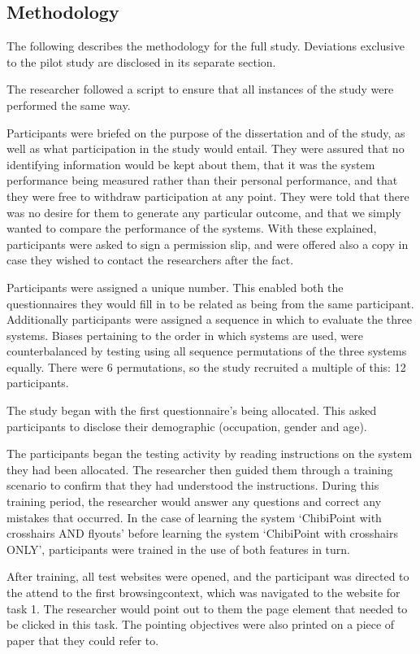 \documentclass[a4paper, 12pt]{report}
\begin{document}
\subsection{Methodology}
The following describes the methodology for the full study. Deviations exclusive to the pilot study are disclosed in its separate section.

The researcher followed a script to ensure that all instances of the study were performed the same way.

Participants were briefed on the purpose of the dissertation and of the study, as well as what participation in the study would entail. They were assured that no identifying information would be kept about them, that it was the system performance being measured rather than their personal performance, and that they were free to withdraw participation at any point. They were told that there was no desire for them to generate any particular outcome, and that we simply wanted to compare the performance of the systems. With these explained, participants were asked to sign a permission slip, and were offered also a copy in case they wished to contact the researchers after the fact.

Participants were assigned a unique number. This enabled both the questionnaires they would fill in to be related as being from the same participant. Additionally participants were assigned a sequence in which to evaluate the three systems. Biases pertaining to the order in which systems are used, were counterbalanced by testing using all sequence permutations of the three systems equally. There were 6 permutations, so the study recruited a multiple of this: 12 participants.

The study began with the first questionnaire's being allocated. This asked participants to disclose their demographic (occupation, gender and age).

The participants began the testing activity by reading instructions on the system they had been allocated. The researcher then guided them through a training scenario to confirm that they had understood the instructions. During this training period, the researcher would answer any questions and correct any mistakes that occurred. In the case of learning the system `ChibiPoint with crosshairs AND flyouts' before learning the system `ChibiPoint with crosshairs ONLY', participants were trained in the use of both features in turn.

After training, all test websites were opened, and the participant was directed to the attend to the first \gls{browsingcontext}, which was navigated to the website for task 1. The researcher would point out to them the page element that needed to be clicked in this task. The pointing objectives were also printed on a piece of paper that they could refer to.
\end{document}
